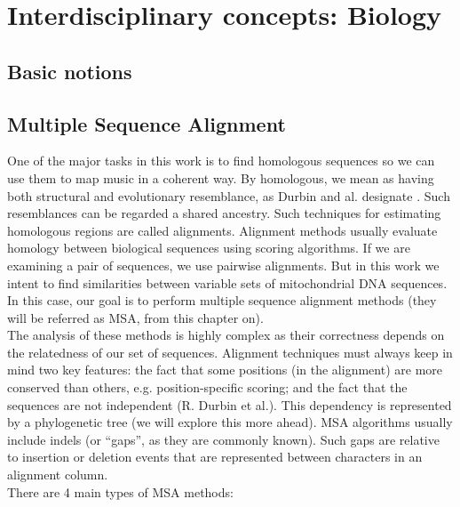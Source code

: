 \documentclass[11pt,twoside,a4paper]{report}
\begin{document}
\section{Interdisciplinary concepts: Biology}
\subsection{Basic notions}
\subsection{Multiple Sequence Alignment}
One of the major tasks in this work is to find homologous sequences so we can use them to map music in a coherent way. By homologous, we mean as having both structural and evolutionary resemblance, as Durbin and al. designate \cite{biodurbin}. Such resemblances can be regarded a shared ancestry. Such techniques for estimating homologous regions are called alignments. Alignment methods usually evaluate homology between biological sequences using scoring algorithms. If we are examining a pair of sequences, we use pairwise alignments. But in this work we intent to find similarities between variable sets of mitochondrial DNA sequences. In this case, our goal is to perform multiple sequence alignment methods (they will be referred as MSA, from this chapter on).\\
The analysis of these methods is highly complex as their correctness depends on the relatedness of our set of sequences. Alignment techniques must always keep in mind two key features: the fact that some positions (in the alignment) are more conserved than others, e.g. position-specific scoring; and the fact that the sequences are not independent (R. Durbin et al.). This dependency is represented by a phylogenetic tree (we will explore this more ahead). MSA algorithms usually include indels (or ``gaps'', as they are commonly known). Such gaps are relative to insertion or deletion events that are represented between characters in an alignment column.\\
There are 4 main types of MSA methods:
\end{document}
